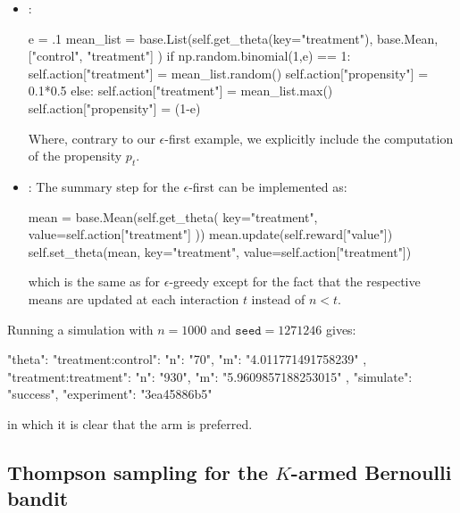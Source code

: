 \documentclass[nojss]{jss}
\begin{document}
\begin{itemize}
\item {}: 
\begin{Code}
e = .1
mean_list = base.List(self.get_theta(key="treatment"), 
    base.Mean, ["control", "treatment"]
    )
if np.random.binomial(1,e) == 1:
    self.action["treatment"] = mean_list.random()
    self.action["propensity"] = 0.1*0.5
else:
    self.action["treatment"] = mean_list.max()
    self.action["propensity"] = (1-e)
\end{Code}
Where, contrary to our $\epsilon$-first example, we explicitly include the computation of the propensity $p_t$.
\item {}: The summary step for the $\epsilon$-first can be implemented as:
\begin{Code}
mean = base.Mean(self.get_theta(
         key="treatment", value=self.action["treatment"]
         ))
mean.update(self.reward["value"])
self.set_theta(mean, key="treatment", value=self.action["treatment"])
\end{Code}
which is the same as for $\epsilon$-greedy except for the fact that the respective means are updated at each interaction $t$ instead of $n<t$.
\end{itemize}

Running a simulation with $n=1000$ and $\texttt{seed}=1271246$ gives:
\begin{Code}
{
    "theta": {
        "treatment:control": {
            "n": "70",
            "m": "4.011771491758239"
        },
        "treatment:treatment": {
            "n": "930",
            "m": "5.9609857188253015"
        }
    },
    "simulate": "success",
    "experiment": "3ea45886b5"
}
\end{Code}
in which it is clear that the  arm is preferred.

\subsection{Thompson sampling for the $K$-armed Bernoulli bandit}
\label{sec:thompson}
\end{document}
